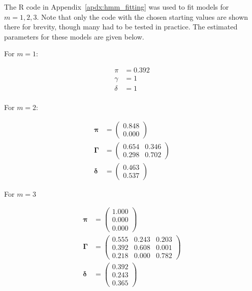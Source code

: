 \documentclass{article}
\begin{document}
The R code in Appendix~\ref{apdx:hmm_fitting} was used to fit models
for \(m = 1, 2, 3\). Note that only the code with the chosen starting
values are shown there for brevity, though many had to be tested in
practice. The estimated parameters for these models are given below.

For \(m = 1 \):

\begin{align*}
  \pi    &= 0.392 \\
  \gamma &= 1 \\
  \delta &= 1 \\
\end{align*}

For \(m = 2\):

\begin{align*}
  \pmb{\pi}    &= \begin{pmatrix} 0.848 \\ 0.000 \end{pmatrix} \\
  \pmb{\Gamma} &= \begin{pmatrix} 0.654 & 0.346 \\
                            0.298 & 0.702 \end{pmatrix} \\
  \pmb{\delta} &= \begin{pmatrix} 0.463 \\ 0.537 \end{pmatrix}
\end{align*}

For \(m = 3\)

\begin{align*}
  \pmb{\pi}    &= \begin{pmatrix} 1.000 \\ 0.000 \\ 0.000 \end{pmatrix} \\
  \pmb{\Gamma} &= \begin{pmatrix} 0.555 & 0.243 & 0.203 \\
                            0.392 & 0.608 & 0.001 \\
                            0.218 & 0.000 & 0.782  \end{pmatrix} \\
  \pmb{\delta} &= \begin{pmatrix} 0.392 \\0.243 \\ 0.365 \end{pmatrix}
\end{align*}
\end{document}
